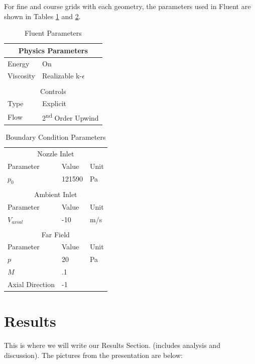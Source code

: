 \documentclass[12pt]{article} %
\begin{document}
For fine and course grids with each geometry, the parameters used in Fluent are shown in Tables \ref{tab:parameter1} and \ref{tab:parameter2}. 

\begin{table}[ht]
    \caption{Fluent Parameters}
    \centering
    \begin{tabular}{l|l}
        \multicolumn{2}{c}{Physics Parameters}\\
        \hline
        Energy&On\\
        Viscosity&Realizable k-$\epsilon$\\
        \hline
        \multicolumn{2}{c}{}\\
        \multicolumn{2}{c}{Controls}\\
        \hline
        Type&Explicit\\
        Flow&2\textsuperscript{nd} Order Upwind\\
        \hline
    \end{tabular}
    \label{tab:parameter1}
\end{table}

\begin{table}[ht]
    \caption{Boundary Condition Parameters}
    \centering
    \begin{tabular}{l|l|l}
        \multicolumn{3}{c}{Nozzle Inlet}\\
        Parameter&Value&Unit\\
        \hline
        $p_0$&121590&Pa\\
        \hline
        \multicolumn{3}{c}{}\\
        \multicolumn{3}{c}{Ambient Inlet}\\
        Parameter&Value&Unit\\
        \hline
        $V_{axial}$&-10&m/s\\
        \hline
        \multicolumn{3}{c}{}\\
        \multicolumn{3}{c}{Far Field}\\
        Parameter&Value&Unit\\
        \hline
        $p$&20&Pa\\
        $M$&.1&\\
        Axial Direction&-1&\\
        \hline
    \end{tabular}
    \label{tab:parameter2}
\end{table}

\clearpage
\section{Results}
This is where we will write our Results Section.  (includes analysis and discussion). The pictures from the presentation are below:
\end{document}
